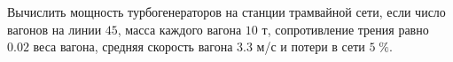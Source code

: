 Вычислить мощность турбогенераторов на станции трамвайной сети, если
число вагонов на линии $45$, масса каждого вагона $10$ т, сопротивление
трения равно $0.02$ веса вагона, средняя скорость вагона $3.3$ м/с и
потери в сети $5\;\%$.

